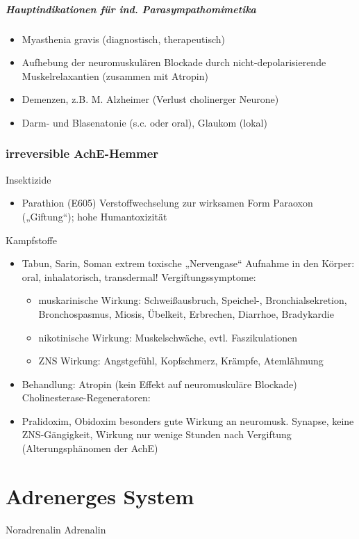 \documentclass[10pt,a4paper]{report}
\begin{document}
\paragraph{Hauptindikationen für ind. Parasympathomimetika}
\begin{itemize}
	\item Myasthenia gravis (diagnostisch, therapeutisch)
	\item Aufhebung der neuromuskulären Blockade durch nicht-depolarisierende 	Muskelrelaxantien (zusammen mit Atropin)
	\item Demenzen, z.B. M. Alzheimer (Verlust cholinerger Neurone)
	\item Darm- und Blasenatonie (s.c. oder oral), Glaukom (lokal)
\end{itemize}
\subsection{irreversible AchE-Hemmer}
Insektizide
\begin{itemize}
	\item Parathion (E605)	Verstoffwechselung zur wirksamen Form Paraoxon („Giftung“); hohe Humantoxizität
\end{itemize}
Kampfstoffe
\begin{itemize}
	\item Tabun, Sarin, Soman	extrem toxische „Nervengase“	
Aufnahme in den Körper:  oral, inhalatorisch, transdermal!
Vergiftungssymptome: 
	\begin{itemize}
		\item muskarinische Wirkung: Schweißausbruch, Speichel-, 	Bronchialsekretion, Bronchospasmus, Miosis, Übelkeit, Erbrechen, Diarrhoe, Bradykardie
		\item nikotinische Wirkung:	Muskelschwäche, evtl. Faszikulationen
		\item ZNS Wirkung: Angstgefühl, Kopfschmerz, Krämpfe, Atemlähmung
\end{itemize}
	\item Behandlung:	Atropin (kein Effekt auf neuromuskuläre Blockade)
		Cholinesterase-Regeneratoren:
	\item Pralidoxim, Obidoxim	besonders gute Wirkung an neuromusk. Synapse, keine ZNS-Gängigkeit, Wirkung nur wenige Stunden nach Vergiftung (Alterungsphänomen der AchE)
\end{itemize}
\chapter{Adrenerges System}
Noradrenalin Adrenalin
\end{document}
